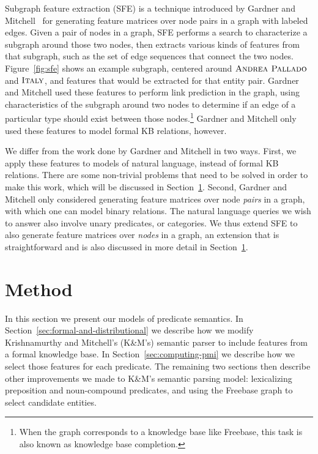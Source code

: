 \documentclass[11pt]{article}
\newcommand{\secref}[1]{Section~\ref{sec:#1}}
\newcommand{\figref}[1]{Figure~\ref{fig:#1}}
\newcommand{\entity}[1]{\ensuremath{\textsc{#1}}}
\begin{document}
Subgraph feature extraction (SFE) is a technique introduced by Gardner and
Mitchell~ for generating feature matrices over node
pairs in a graph with labeled edges.  Given a pair of nodes in a graph, SFE
performs a search to characterize a subgraph around those two nodes, then
extracts various kinds of features from that subgraph, such as the set of edge
sequences that connect the two nodes.  \figref{sfe} shows an example subgraph,
centered around \entity{Andrea Pallado} and \entity{Italy}, and features that
would be extracted for that entity pair.  Gardner and Mitchell used these
features to perform link prediction in the graph, using characteristics of the
subgraph around two nodes to determine if an edge of a particular type should
exist between those nodes.\footnote{When the graph corresponds to a knowledge
base like Freebase, this task is also known as knowledge base completion.}
Gardner and Mitchell only used these features to model formal KB relations,
however.

We differ from the work done by Gardner and Mitchell in two ways.  First, we
apply these features to models of natural language, instead of formal KB
relations.  There are some non-trivial problems that need to be solved in order
to make this work, which will be discussed in \secref{method}.  Second, Gardner
and Mitchell only considered generating feature matrices over node \emph{pairs}
in a graph, with which one can model binary relations.  The natural language
queries we wish to answer also involve unary predicates, or categories.  We
thus extend SFE to also generate feature matrices over \emph{nodes} in a graph,
an extension that is straightforward and is also discussed in more detail in
\secref{method}.

\section{Method}
\label{sec:method}

In this section we present our models of predicate semantics.  In
\secref{formal-and-distributional} we describe how we modify Krishnamurthy and
Mitchell's (K\&M's) semantic parser to include features from a formal knowledge
base.  In \secref{computing-pmi} we describe how we select those features for
each predicate.  The remaining two sections then describe other improvements we
made to K\&M's semantic parsing model: lexicalizing preposition and
noun-compound predicates, and using the Freebase graph to select candidate
entities.
\end{document}
